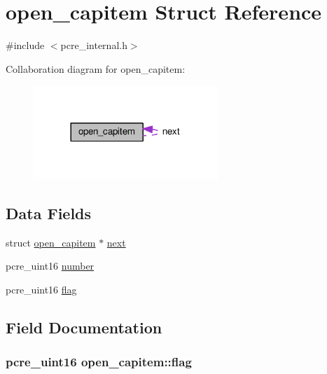 \hypertarget{structopen__capitem}{}\section{open\+\_\+capitem Struct Reference}
\label{structopen__capitem}


{\ttfamily \#include $<$pcre\+\_\+internal.\+h$>$}



Collaboration diagram for open\+\_\+capitem\+:
\nopagebreak
\begin{figure}[H]
\begin{center}
\leavevmode
\includegraphics[width=197pt]{structopen__capitem__coll__graph}
\end{center}
\end{figure}
\subsection*{Data Fields}
\begin{DoxyCompactItemize}
\item 
struct \hyperlink{structopen__capitem}{open\+\_\+capitem} $\ast$ \hyperlink{structopen__capitem_a17c798a7eb4e1b655cdb621114d50fb7}{next}
\item 
pcre\+\_\+uint16 \hyperlink{structopen__capitem_ad3164afb02e13546cbcdbefba746ab91}{number}
\item 
pcre\+\_\+uint16 \hyperlink{structopen__capitem_aaeb2aeb0550cefe677a7d36da7b1548e}{flag}
\end{DoxyCompactItemize}


\subsection{Field Documentation}
\subsubsection[{\texorpdfstring{flag}{flag}}]{\setlength{\rightskip}{0pt plus 5cm}pcre\+\_\+uint16 open\+\_\+capitem\+::flag}\hypertarget{structopen__capitem_aaeb2aeb0550cefe677a7d36da7b1548e}{}\label{structopen__capitem_aaeb2aeb0550cefe677a7d36da7b1548e}
